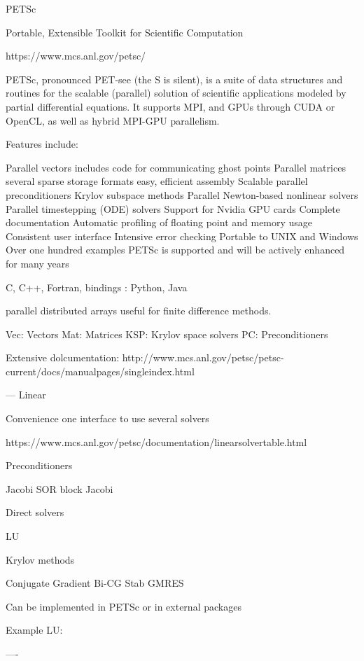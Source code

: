 \documentclass{article}
\begin{document}
PETSc

Portable, Extensible Toolkit for
Scientific Computation

https://www.mcs.anl.gov/petsc/

PETSc, pronounced PET-see (the S is silent), is a suite of data structures and routines for the scalable (parallel) solution of scientific applications modeled by partial differential equations. It supports MPI, and GPUs through CUDA or OpenCL, as well as hybrid MPI-GPU parallelism. 

 Features include:

    Parallel vectors
        includes code for communicating ghost points
    Parallel matrices
        several sparse storage formats
        easy, efficient assembly
    Scalable parallel preconditioners
    Krylov subspace methods
    Parallel Newton-based nonlinear solvers
    Parallel timestepping (ODE) solvers
    Support for Nvidia GPU cards
    Complete documentation
    Automatic profiling of floating point and memory usage
    Consistent user interface
    Intensive error checking
    Portable to UNIX and Windows
    Over one hundred examples
    PETSc is supported and will be actively enhanced for many years


C, C++, Fortran,    bindings : Python, Java

parallel distributed arrays useful for finite difference methods. 



Vec: Vectors
Mat: Matrices
KSP: Krylov space solvers
PC: Preconditioners

Extensive dolcumentation:
http://www.mcs.anl.gov/petsc/petsc-current/docs/manualpages/singleindex.html

---
Linear

Convenience one interface to use several solvers

https://www.mcs.anl.gov/petsc/documentation/linearsolvertable.html


Preconditioners

Jacobi
SOR
block Jacobi



Direct solvers

LU

Krylov methods

Conjugate Gradient
Bi-CG Stab
GMRES


Can be implemented in PETSc or in external packages

Example LU:


----
\end{document}
